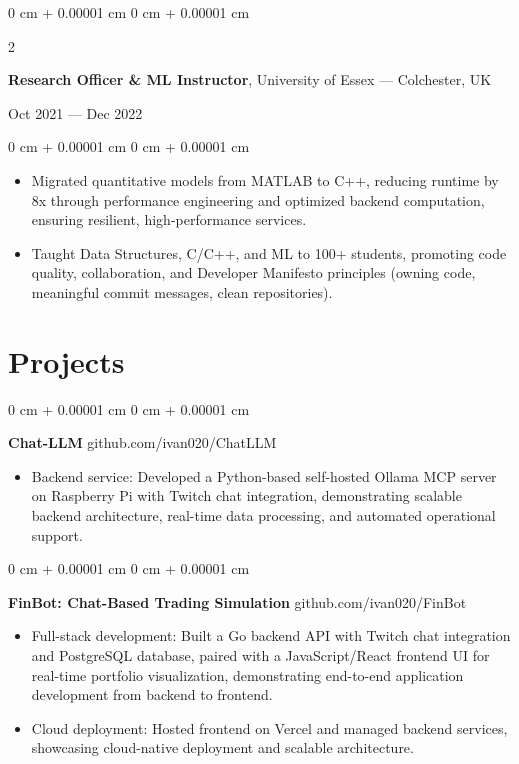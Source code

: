 \documentclass[6pt, letterpaper]{article}
\newenvironment{highlights}{
    \begin{itemize}[
        topsep=0.03 cm,
        parsep=0.03 cm,
        partopsep=0pt,
        itemsep=0pt,
        leftmargin=0 cm + 10pt
    ]
}{
    \end{itemize}
} %
\newenvironment{onecolentry}{
    \begin{adjustwidth}{
        0 cm + 0.00001 cm
    }{
        0 cm + 0.00001 cm
    }
}{
    \end{adjustwidth}
} %
\newenvironment{twocolentry}[2][]{
    \onecolentry
    \def\secondColumn{#2}
    \setcolumnwidth{\fill, 4.5 cm}
    \begin{paracol}{2}
}{
    \switchcolumn \raggedleft \secondColumn
    \end{paracol}
    \endonecolentry
} %
\begin{document}
        \begin{twocolentry}{Oct 2021 --- Dec 2022}
        \textbf{Research Officer \& ML Instructor}, University of Essex --- Colchester, UK
        \end{twocolentry}

        \begin{onecolentry}
        \begin{highlights}
        \item Migrated quantitative models from MATLAB to C++, reducing runtime by 8x through performance engineering and optimized backend computation, ensuring resilient, high-performance services.
        \item Taught Data Structures, C/C++, and ML to 100+ students, promoting code quality, collaboration, and Developer Manifesto principles (owning code, meaningful commit messages, clean repositories).

        \end{highlights}
        \end{onecolentry}


    \section{Projects}

    \begin{onecolentry}
        \textbf{Chat-LLM} \hfill github.com/ivan020/ChatLLM

        \begin{highlights}
            \item Backend service: Developed a Python-based self-hosted Ollama MCP server on Raspberry Pi with Twitch chat integration, demonstrating scalable backend architecture, real-time data processing, and automated operational support.
        \end{highlights}
    \end{onecolentry}

    \begin{onecolentry}
        \textbf{FinBot: Chat-Based Trading Simulation} \hfill github.com/ivan020/FinBot

        \begin{highlights}
            \item Full-stack development: Built a Go backend API with Twitch chat integration and PostgreSQL database, paired with a JavaScript/React frontend UI for real-time portfolio visualization, demonstrating end-to-end application development from backend to frontend.
            \item Cloud deployment: Hosted frontend on Vercel and managed backend services, showcasing cloud-native deployment and scalable architecture.
        \end{highlights}
    \end{onecolentry}
\end{document}
